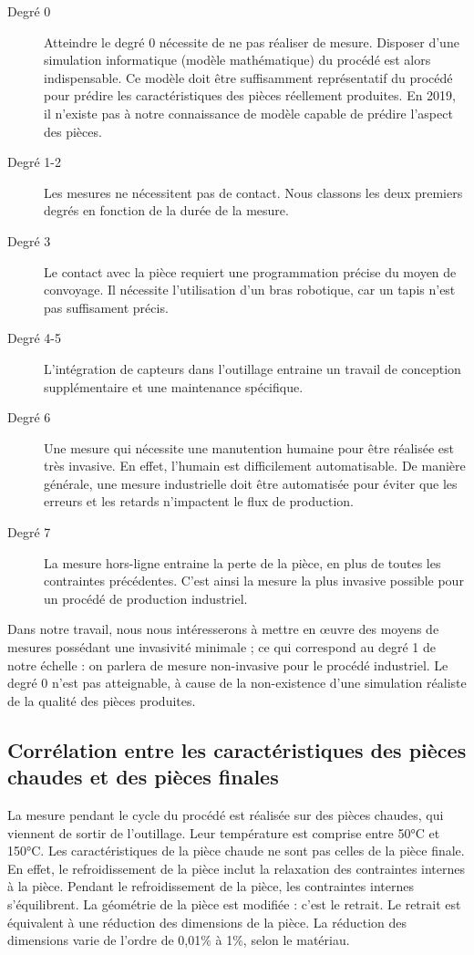 \begin{description}
	\item[Degré 0] Atteindre le degré 0 nécessite de ne pas réaliser de mesure.
	Disposer d'une simulation informatique (modèle mathématique) du procédé est alors indispensable.
	Ce modèle doit être suffisamment représentatif du procédé pour prédire les caractéristiques des pièces réellement produites.
	En 2019, il n'existe pas à notre connaissance de modèle capable de prédire l'aspect des pièces.
	\item[Degré 1-2] Les mesures ne nécessitent pas de contact. Nous classons les deux premiers degrés en fonction de la durée de la mesure.
	\item[Degré 3] Le contact avec la pièce requiert une programmation précise du moyen de convoyage.
	Il nécessite l'utilisation d'un bras robotique, car un tapis n'est pas suffisament précis.
	\item[Degré 4-5] L'intégration de capteurs dans l'outillage entraine un travail de conception supplémentaire et une maintenance spécifique.
	\item[Degré 6] Une mesure qui nécessite une manutention humaine pour être réalisée est très invasive.
	En effet, l'humain est difficilement automatisable.
	De manière générale, une mesure industrielle doit être automatisée pour éviter que les erreurs et les retards n'impactent le flux de production.
	\item[Degré 7] La mesure hors-ligne entraine la perte de la pièce, en plus de toutes les contraintes précédentes. C'est ainsi la mesure la plus invasive possible pour un procédé de production industriel.
\end{description} 

\noindent
Dans notre travail, nous nous intéresserons à mettre en œuvre des moyens de mesures possédant une invasivité minimale ; ce qui correspond au degré 1 de notre échelle : on parlera de mesure non-invasive pour le procédé industriel.
Le degré 0 n'est pas atteignable, à cause de la non-existence d'une simulation réaliste de la qualité des pièces produites.

\subsection{Corrélation entre les caractéristiques des pièces chaudes et des pièces finales}
La mesure pendant le cycle du procédé est réalisée sur des pièces chaudes, qui viennent de sortir de l'outillage.
Leur température est comprise entre 50°C et 150°C.
Les caractéristiques de la pièce chaude ne sont pas celles de la pièce finale.
En effet, le refroidissement de la pièce inclut la relaxation des contraintes internes à la pièce.
Pendant le refroidissement de la pièce, les contraintes internes s'équilibrent.
La géométrie de la pièce est modifiée : c'est le retrait.
Le retrait est équivalent à une réduction des dimensions de la pièce.
La réduction des dimensions varie de l'ordre de 0,01\% à 1\%, selon le matériau.

